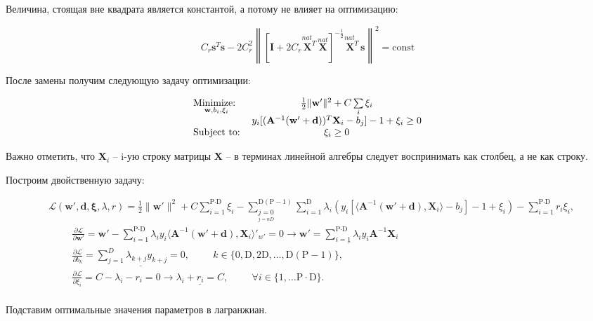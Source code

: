 \documentclass[CEJM,PDF]{Class+Reg_in_Molec_Docking} %
\begin{document}
Величина, стоящая вне квадрата является константой, а потому не влияет на оптимизацию:

$$C_r\mathbf{s}^T\mathbf{s} - 2C_r^2\left\| \left[ \mathbf{I} + 2C_r\overset{nat\;\;\;}{\mathbf{X}^T}\overset{nat}{\mathbf{X}} \right]^{-\frac{1}{2}}\overset{nat\;\;\;}{\mathbf{X}^T}\mathbf{s} \right\|^2 = \text{const}$$

После замены получим следующую задачу оптимизации:

\begin{eqnarray}\label{Class+Regres_new} 
\begin{tabular}{lc}
$\underset{\mathbf{w}, b_i, \xi_{i}}{\text{Minimize: }}$ &$ \frac{1}{2} \|\mathbf{w'}\|^2 + C\sum\limits_{i}\xi_{i}$ \\ 
\multirow{3}{*}{Subject to:}
&$y_{i}[(\mathbf{A}^{-1}(\mathbf{w' + d}))^T\mathbf{X}_{i} - b_j]-1+\xi_{i} \geq 0$\\
&$\xi_{i} \geq 0$
\end{tabular}
\label{eq:primalboth} 
\end{eqnarray}

Важно отметить, что $\mathbf{X}_i$ -- i-ую строку матрицы $\mathbf{X}$ -- в терминах линейной алгебры следует воспринимать как столбец, а не как строку.

Построим двойственную задачу:

\begin{equation}
\begin{aligned}
&\mathcal{L}(\mathbf{w'}, \mathbf{d}, \mathbf{\xi}, \lambda, r) = \frac{1}{2} \|\mathbf{w'}\|^2 + C\sum\limits_{i=1}^{\text{P}\cdot\text{D}}\xi_{i} - 
\sum_{\underset{{j=nD}}{j=0}}^{\text{D}(\text{P}-1)}\sum_{i=1}^{\text{D}}{\lambda_{i} \left( y_{i}[\langle \mathbf{A}^{-1}\left(\mathbf{w}'+\mathbf{d}\right), \mathbf{X}_{i}\rangle - b_j]-1+\xi_{i} \right)} - \sum_{i=1}^{\text{P}\cdot\text{D}}{r_{i}\xi_{i}}, \\
& \hspace{1cm}\frac{\partial{\mathcal{L}}}{\partial{\mathbf{w'}}} = \mathbf{w'} - \sum_{i=1}^{\text{P}\cdot\text{D}}{\lambda_{i}y_{i}\langle \mathbf{A}^{-1}\left(\mathbf{w'}+\mathbf{d}\right), \mathbf{X}_{i} \rangle}'_{w'} = 0 \rightarrow \underline{\mathbf{w}' = \sum_{i=1}^{\text{P}\cdot\text{D}}{\lambda_{i}y_{i}\mathbf{A}^{-1} \mathbf{X}_{i}}} \\
& 
\hspace{1cm}\frac{\partial{\mathcal{L}}}{\partial{b_k}} = \underline{\sum_{j=1}^D{\lambda_{k+j}y_{k+j}} = 0}, \hspace{1cm} k \in \{ 0,\text{D},2\text{D},\hdots,\text{D}(\text{P} - 1) \},  \\
& \hspace{1cm}\frac{\partial{\mathcal{L}}}{\partial{\xi_{i}}} = C - \lambda_{i} - r_{i} = 0 \rightarrow \underline{\lambda_{i} + r_{i} = C}, \hspace{1cm} \forall i \in \{1,\hdots\text{P}\cdot\text{D}\}.
\end{aligned}
\end{equation}
\\
Подставим оптимальные значения параметров в лагранжиан.
\end{document}
